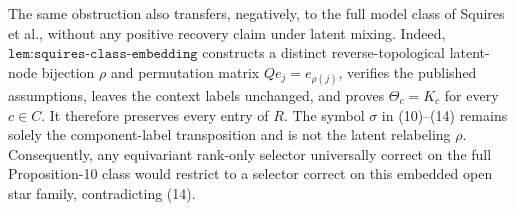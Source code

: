 The same obstruction also transfers, negatively, to the full model class of Squires et al., without any positive recovery claim under latent mixing.  Indeed, \(\texttt{lem:squires-class-embedding}\) constructs a distinct reverse-topological latent-node bijection \(\rho\) and permutation matrix \(Qe_j=e_{\rho(j)}\), verifies the published assumptions, leaves the context labels unchanged, and proves \(\Theta_c=K_c\) for every \(c\in C\).  It therefore preserves every entry of \(R\).  The symbol \(\sigma\) in (10)--(14) remains solely the component-label transposition and is not the latent relabeling \(\rho\).  Consequently, any equivariant rank-only selector universally correct on the full Proposition-10 class would restrict to a selector correct on this embedded open star family, contradicting (14).

